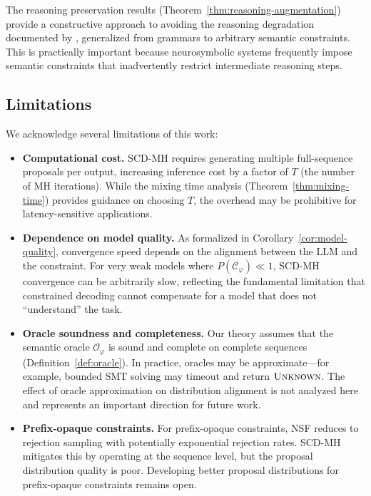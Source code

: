 \documentclass[twoside,11pt]{article}
\newcommand{\Oracle}{\mathcal{O}}
\newcommand{\Constraint}{\mathcal{C}}
\begin{document}
The reasoning preservation results (Theorem~\ref{thm:reasoning-augmentation})
provide a constructive approach to avoiding the reasoning degradation
documented by \citet{banerjee2025crane}, generalized from grammars to
arbitrary semantic constraints. This is practically important because
neurosymbolic systems frequently impose semantic constraints that
inadvertently restrict intermediate reasoning steps.

\subsection{Limitations}
\label{sec:limitations}

We acknowledge several limitations of this work:

\begin{itemize}
    \item \textbf{Computational cost.} SCD-MH requires generating multiple
    full-sequence proposals per output, increasing inference cost by a factor
    of $T$ (the number of MH iterations). While the mixing time analysis
    (Theorem~\ref{thm:mixing-time}) provides guidance on choosing $T$, the
    overhead may be prohibitive for latency-sensitive applications.

    \item \textbf{Dependence on model quality.} As formalized in
    Corollary~\ref{cor:model-quality}, convergence speed depends on the
    alignment between the LLM and the constraint. For very weak models where
    $P(\Constraint_\varphi) \ll 1$, SCD-MH convergence can be arbitrarily
    slow, reflecting the fundamental limitation that constrained decoding
    cannot compensate for a model that does not ``understand'' the task.

    \item \textbf{Oracle soundness and completeness.} Our theory assumes
    that the semantic oracle $\Oracle_\varphi$ is sound and complete on
    complete sequences (Definition~\ref{def:oracle}). In practice, oracles
    may be approximate---for example, bounded SMT solving may timeout and
    return $\textsc{Unknown}$. The effect of oracle approximation on
    distribution alignment is not analyzed here and represents an important
    direction for future work.

    \item \textbf{Prefix-opaque constraints.} For prefix-opaque constraints,
    NSF reduces to rejection sampling with potentially exponential rejection
    rates. SCD-MH mitigates this by operating at the sequence level, but the
    proposal distribution quality is poor. Developing better proposal
    distributions for prefix-opaque constraints remains open.
\end{itemize}
\end{document}
